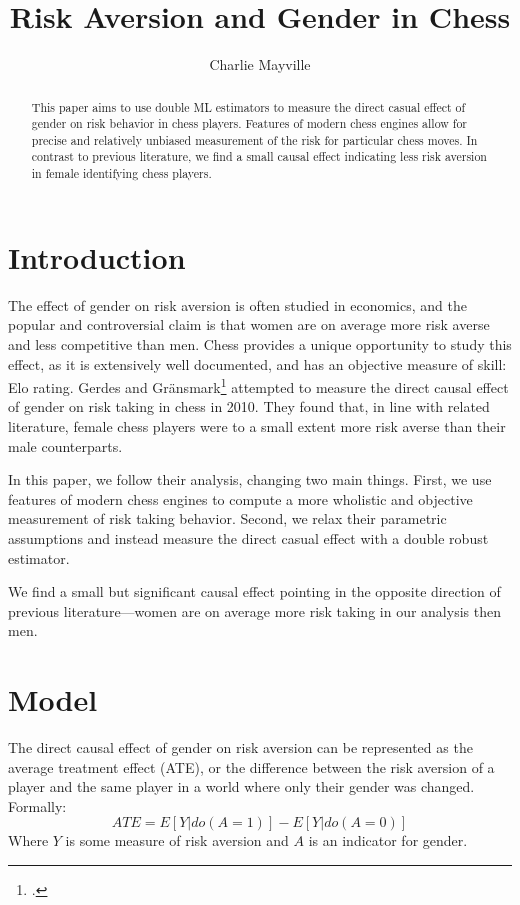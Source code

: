 \documentclass[letterpaper, 11pt]{article}
\title{Risk Aversion and Gender in Chess}
\author{Charlie Mayville}
\begin{document}
\maketitle

    \begin{abstract}
        This paper aims to use double ML estimators to measure the direct casual effect of gender on risk behavior in chess players.
        Features of modern chess engines allow for precise and relatively unbiased measurement of the risk for particular chess moves.
        In contrast to previous literature, we find a small causal effect indicating less risk aversion in female identifying chess players.
    \end{abstract}

    \section*{Introduction}
        The effect of gender on risk aversion is often studied in economics, and the popular and controversial claim is that women are on average more risk averse and less competitive than men.
        Chess provides a unique opportunity to study this effect, as it is extensively well documented, and has an objective measure of skill: Elo rating.
        Gerdes and Gränsmark\footcite{gerdes:gender} attempted to measure the direct causal effect of gender on risk taking in chess in 2010.
        They found that, in line with related literature, female chess players were to a small extent more risk averse than their male counterparts.
    
        In this paper, we follow their analysis, changing two main things. 
        First, we use features of modern chess engines to compute a more wholistic and objective measurement of risk taking behavior. 
        Second, we relax their parametric assumptions and instead measure the direct casual effect with a double robust estimator.
        
        We find a small but significant causal effect pointing in the opposite direction of previous literature---women are on average more risk taking in our analysis then men.

    \section*{Model}
        The direct causal effect of gender on risk aversion can be represented as the average treatment effect (ATE), or the difference between the risk aversion of a player and the same player in a world where only their gender was changed.
        Formally:
        $$ ATE = E[ Y | do( A = 1) ] - E[ Y | do ( A = 0) ] $$
        Where $Y$ is some measure of risk aversion and $A$ is an indicator for gender.
    
\end{document}
